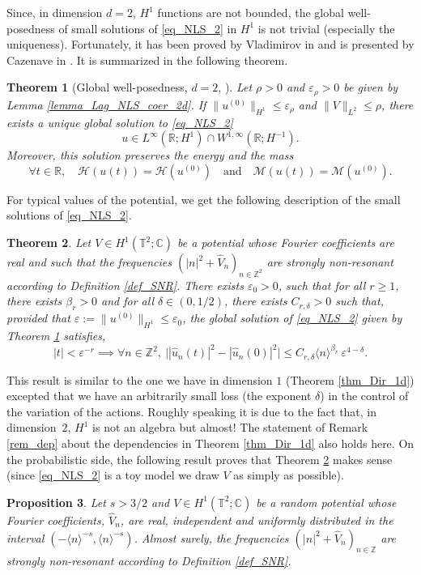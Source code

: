 \documentclass[JEP,XML,SOM,Unicode,NoEqCountersInSection,published]{cedram}
\let\epsilon\varepsilon
\newtheorem{theorem}{Theorem}[section]
\newtheorem{proposition}[theorem]{Proposition}
\theoremstyle{definition}
\begin{document}
Since, in dimension $d=2$, $H^1$ functions are not bounded, the global well-posedness of small solutions of \eqref{eq_NLS_2} in $H^1$ is not trivial (especially the uniqueness). Fortunately, it has been proved by Vladimirov in \cite{Vla84} and is presented by Cazenave in \cite[Th.\,3.6.1, p.\,78]{Caz03}. It is summarized in the following theorem.
\begin{theorem}[Global well-posedness, $d=2$, \cite{Vla84}]
\label{thm_GWP_NLS_2d} Let $\rho >0$ and $\varepsilon_{\rho}>0$ be given by Lemma \ref{lemma_Lag_NLS_coer_2d}. If $\|u^{(0)} \|_{H^1} \leq \varepsilon_{\rho}$ and $\| V\|_{L^2} \leq \rho$, there exists a unique global solution to \eqref{eq_NLS_2}
\[
u \in L^\infty(\mathbb{R}; H^1) \cap W^{1,\infty}(\mathbb{R};H^{-1}).
\]
Moreover, this solution preserves the energy and the mass
\[
\forall t\in \mathbb{R}, \quad \mathcal{H}(u(t)) = \mathcal{H}(u^{(0)}) \quad \text{and} \quad \mathcal{M}(u(t)) = \mathcal{M}(u^{(0)}).
\]
\end{theorem}

For typical values of the potential, we get the following description of the small solutions of \eqref{eq_NLS_2}.
\begin{theorem}
\label{thm_per_2d}
Let $V\in H^1(\mathbb T^2;\mathbb{C})$ be a potential whose Fourier coefficients are real and such that the frequencies $(|n|^2+\widehat{V}_n)_{n\in \mathbb{Z}^2}$ are strongly non-resonant according to Definition \ref{def_SNR}. There exists $\epsilon_0>0$, such that for all $r\geq 1$, there exists $\beta_r>0$ and for all $\delta \in (0,1/2)$, there exists $C_{r,\delta}>0$ such that, provided that $\varepsilon:= \| u^{(0)} \|_{H^1} \leq \epsilon_{0}$,
the global solution of \eqref{eq_NLS_2} given by Theorem \ref{thm_GWP_NLS_2d} satisfies,
\[
|t|< \varepsilon^{-r} \implies \forall n \in \mathbb{Z}^2, \ \big| |\widehat{u}_{n}(t)|^2 - |\widehat{u}_{n}(0)|^2 \big| \leq C_{r,\delta} \langle n \rangle^{\beta_r} \ \varepsilon^{4-\delta}.
\]
\end{theorem}
This result is similar to the one we have in dimension $1$ (\ie Theorem \ref{thm_Dir_1d}) excepted that we have an arbitrarily small loss (the exponent $\delta$) in the control of the variation of the actions. Roughly speaking it is due to the fact that, in dimension~$2$, $H^1$ is not an algebra but almost! The statement of Remark \eqref{rem_dep} about the dependencies in Theorem \ref{thm_Dir_1d} also holds here. On the probabilistic side, the following result proves that Theorem \ref{thm_per_2d} makes sense (since \eqref{eq_NLS_2} is a toy model we draw $V$ as simply as possible).
\begin{proposition}
\label{prop_proba_dir_2d}
Let $s>3/2$ and $V \in H^1(\mathbb T^2;\mathbb{C})$ be a random potential whose Fourier coefficients, $\widehat{V}_n$, are real, independent and uniformly distributed in the interval $(-\langle n \rangle^{-s},\langle n \rangle^{-s})$. Almost surely, the frequencies $(|n|^2+\widehat{V}_n)_{n\in \mathbb{Z}}$ are strongly non-resonant according to Definition \ref{def_SNR}.
\end{proposition}
\end{document}
